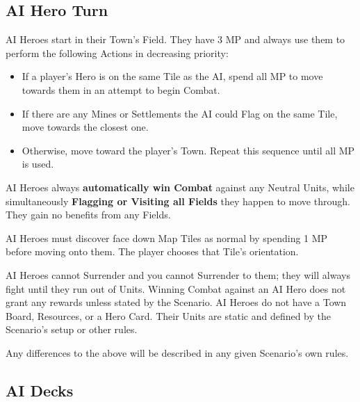 
\begin{multicols}{2}

\subsection*{AI Hero Turn}

AI Heroes start in their Town's Field.
They have 3 MP and always use them to perform the following Actions in decreasing priority:
\begin{itemize}
  \item If a player's Hero is on the same Tile as the AI, spend all MP to move towards them in an attempt to begin Combat.
  \item If there are any Mines or Settlements the AI could Flag on the same Tile, move towards the closest one.
  \item Otherwise, move toward the player's Town.
Repeat this sequence until all MP is used.
\end{itemize}

AI Heroes always \textbf{automatically win Combat} against any Neutral Units, while simultaneously \textbf{Flagging or Visiting all Fields} they happen to move through.
They gain no benefits from any Fields.

AI Heroes must discover face down Map Tiles as normal by spending 1 MP before moving onto them.
The player chooses that Tile's orientation.\par
AI Heroes cannot Surrender and you cannot Surrender to them;
they will always fight until they run out of Units.
Winning Combat against an AI Hero does not grant any rewards unless stated by the Scenario.
AI Heroes do not have a Town Board, Resources, or a Hero Card.
Their Units are static and defined by the Scenario's setup or other rules.\par
Any differences to the above will be described in any given Scenario's own rules.

\columnbreak

\subsection*{\hypertarget{AIrules}{AI Decks}}


\end{multicols}
